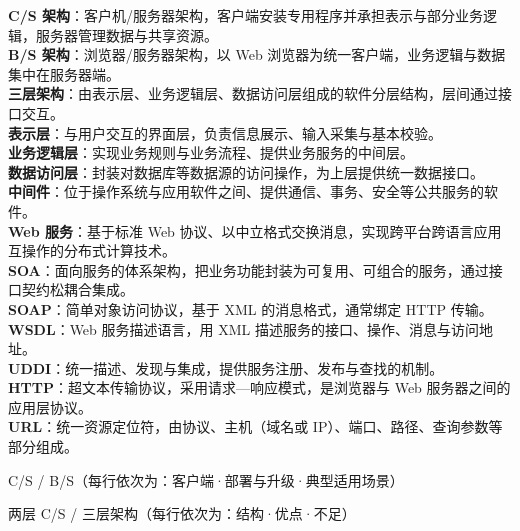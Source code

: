 \documentclass[a4paper,11pt]{article}
\begin{document}
\begin{keyterms}
\textbf{C/S 架构}：客户机/服务器架构，客户端安装专用程序并承担表示与部分业务逻辑，服务器管理数据与共享资源。\\
\textbf{B/S 架构}：浏览器/服务器架构，以 Web 浏览器为统一客户端，业务逻辑与数据集中在服务器端。\\
\textbf{三层架构}：由表示层、业务逻辑层、数据访问层组成的软件分层结构，层间通过接口交互。\\
\textbf{表示层}：与用户交互的界面层，负责信息展示、输入采集与基本校验。\\
\textbf{业务逻辑层}：实现业务规则与业务流程、提供业务服务的中间层。\\
\textbf{数据访问层}：封装对数据库等数据源的访问操作，为上层提供统一数据接口。\\
\textbf{中间件}：位于操作系统与应用软件之间、提供通信、事务、安全等公共服务的软件。\\
\textbf{Web 服务}：基于标准 Web 协议、以中立格式交换消息，实现跨平台跨语言应用互操作的分布式计算技术。\\
\textbf{SOA}：面向服务的体系架构，把业务功能封装为可复用、可组合的服务，通过接口契约松耦合集成。\\
\textbf{SOAP}：简单对象访问协议，基于 XML 的消息格式，通常绑定 HTTP 传输。\\
\textbf{WSDL}：Web 服务描述语言，用 XML 描述服务的接口、操作、消息与访问地址。\\
\textbf{UDDI}：统一描述、发现与集成，提供服务注册、发布与查找的机制。\\
\textbf{HTTP}：超文本传输协议，采用请求—响应模式，是浏览器与 Web 服务器之间的应用层协议。\\
\textbf{URL}：统一资源定位符，由协议、主机（域名或 IP）、端口、路径、查询参数等部分组成。
\end{keyterms}

\begin{contrast}{C/S / B/S（每行依次为：客户端·部署与升级·典型适用场景）}
\end{contrast}

\newpage
\begin{contrast}{两层 C/S / 三层架构（每行依次为：结构·优点·不足）}
\end{contrast}
\end{document}
